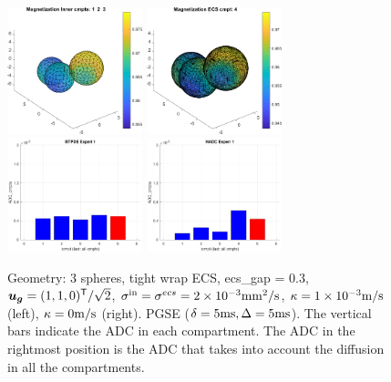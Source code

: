 \documentclass[a4paper]{article}
\begin{document}
\begin{figure}
    \centering
    \includegraphics[width=0.35\textwidth]{plot_magnetization/3sph_cells_perm.png} \quad
    \includegraphics[width=0.35\textwidth]{plot_magnetization/3sph_ecs_perm.png} \\
    \vspace{0.8cm}
    \includegraphics[width=0.35\textwidth]{plot_adc/btpde_3sph_perm.pdf} \quad
    \includegraphics[width=0.35\textwidth]{plot_adc/hadc_3sph_perm.pdf}
    \caption{Geometry: 3 spheres, tight wrap ECS, ecs\_gap = 0.3, $\bm{u}_{\bm{g}}=(1,1,0)^{\mathsf{T}} / \sqrt{2}$, $\sigma^\text{in}=\sigma^{ecs}=2\times10^{-3}\mathrm{mm^2/s}$, $\kappa=1\times 10^{-3} \mathrm{m/s}$ (left), $\kappa = 0\mathrm{m/s}$ (right). PGSE ($\delta=5\mathrm{ms},\Delta=5\mathrm{ms}$). The vertical bars indicate the ADC in each compartment. The ADC in the rightmost position is the ADC that takes into account the diffusion in all the compartments.}
    \label{fig:perm}
\end{figure}
\end{document}

